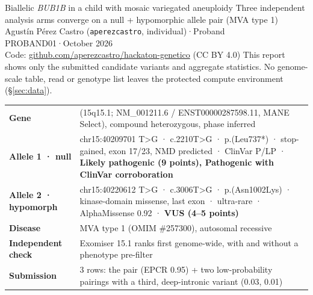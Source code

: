 \documentclass[10pt]{article}
\begin{document}
{Biallelic \textit{BUB1B} in a child with mosaic variegated aneuploidy}
{Three independent analysis arms converge on a null + hypomorphic allele pair (MVA type 1)}
{Agustín Pérez Castro (\texttt{aperezcastro}, individual)\enspace·\enspace Proband PROBAND01\enspace·\enspace October 2026\\
Code: \href{https://github.com/aperezcastro/hackaton-genetico}{github.com/aperezcastro/hackaton-genetico} (CC BY 4.0)}
{This report shows only the submitted candidate variants and aggregate statistics. No genome-scale table, read or
genotype list leaves the protected compute environment (§\ref{sec:data}).}

\begin{keybox}[title={Answer at a glance}]
\begin{tabularx}{\linewidth}{@{}P{3.1cm}L@{}}
\sffamily\small\bfseries Gene & \sffamily\small {} (15q15.1; NM\_001211.6 / ENST00000287598.11, MANE Select), compound heterozygous, phase inferred \\
\sffamily\small\bfseries Allele 1 · null & \sffamily\small chr15:40209701 T>G · c.2210T>G · p.(Leu737*) · stop-gained, exon 17/23, NMD predicted · ClinVar P/LP · \textbf{Likely pathogenic (9 points), Pathogenic with ClinVar corroboration} \\
\sffamily\small\bfseries Allele 2 · hypomorph & \sffamily\small chr15:40220612 T>G · c.3006T>G · p.(Asn1002Lys) · kinase-domain missense, last exon · ultra-rare · AlphaMissense 0.92 · \textbf{VUS (4--5 points)} \\
\sffamily\small\bfseries Disease & \sffamily\small MVA type 1 (OMIM \#257300), autosomal recessive \\
\sffamily\small\bfseries Independent check & \sffamily\small Exomiser 15.1 ranks  first genome-wide, with and without a phenotype pre-filter \\
\sffamily\small\bfseries Submission & \sffamily\small 3 rows: the pair (EPCR 0.95) + two low-probability pairings with a third, deep-intronic  variant (0.03, 0.01)
\end{tabularx}
\end{keybox}

\vspace{2pt}
\noindent{}\hfill
{}\hfill
{}\hfill
{}
\end{document}
